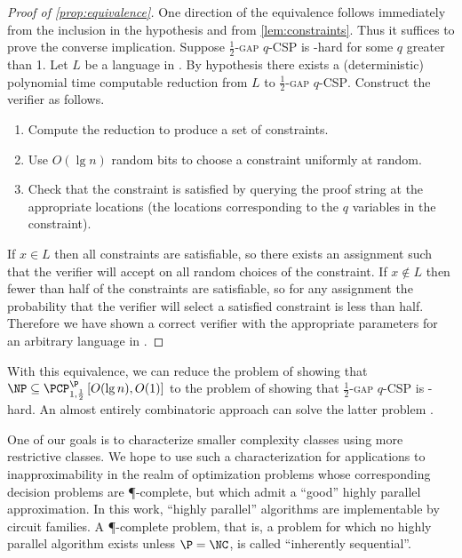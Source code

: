 \documentclass[]{article}
\newcommand{\PCPcs}[5]{\PCP^{#1}_{#2, #3}\left[#4, #5\right]}
\begin{document}
\begin{proof}[Proof of \autoref{prop:equivalence}]
  One direction of the equivalence follows immediately from the inclusion in the hypothesis and from \autoref{lem:constraints}.
  Thus it suffices to prove the converse implication.
  Suppose \textsc{$\frac{1}{2}$-gap $q$-CSP} is \NP-hard for some $q$ greater than 1.
  Let $L$ be a language in \NP.
  By hypothesis there exists a (deterministic) polynomial time computable reduction from $L$ to \textsc{$\frac{1}{2}$-gap $q$-CSP}.
  Construct the \PCP{} verifier as follows.
  \begin{enumerate}
  \item Compute the reduction to produce a set of constraints.
  \item Use $O(\lg n)$ random bits to choose a constraint uniformly at random.
  \item Check that the constraint is satisfied by querying the proof string at the appropriate locations (the locations corresponding to the $q$ variables in the constraint).
  \end{enumerate}

  If $x \in L$ then all constraints are satisfiable, so there exists an assignment such that the verifier will accept on all random choices of the constraint.
  If $x \notin L$ then fewer than half of the constraints are satisfiable, so for any assignment the probability that the verifier will select a satisfied constraint is less than half.
  Therefore we have shown a correct \PCP{} verifier with the appropriate parameters for an arbitrary language in \NP.
\end{proof}
With this equivalence, we can reduce the problem of showing that $\NP \subseteq \PCPcs{\P}{1}{\frac{1}{2}}{O(\lg n)}{O(1)}$ to the problem of showing that \textsc{$\frac{1}{2}$-gap $q$-CSP} is \NP-hard.
An almost entirely combinatoric approach can solve the latter problem \cite{dinur07}.

One of our goals is to characterize smaller complexity classes using more restrictive \PCP{} classes.
We hope to use such a characterization for applications to inapproximability in the realm of optimization problems whose corresponding decision problems are \P-complete, but which admit a ``good'' highly parallel approximation.
In this work, ``highly parallel'' algorithms are implementable by \NC{} circuit families.
A \P-complete problem, that is, a problem for which no highly parallel algorithm exists unless $\P = \NC$, is called ``inherently sequential''.
\end{document}
